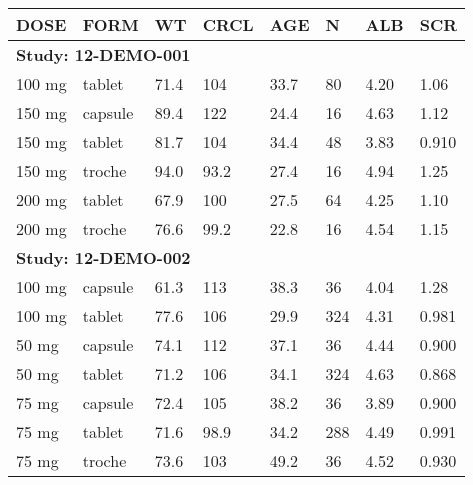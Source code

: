 {\def\arraystretch{1.4}\tabcolsep=5pt
\begin{threeparttable}
\begin{tabular}[h]{llllllll}
\hline
DOSE & FORM & WT & CRCL & AGE & N & ALB & SCR \\
\hline
\multicolumn{8}{l}{\textbf{Study:  12-DEMO-001}}\\
100 mg & tablet & 71.4 & 104 & 33.7 & 80 & 4.20 & 1.06 \\
150 mg & capsule & 89.4 & 122 & 24.4 & 16 & 4.63 & 1.12 \\
150 mg & tablet & 81.7 & 104 & 34.4 & 48 & 3.83 & 0.910 \\
150 mg & troche & 94.0 & 93.2 & 27.4 & 16 & 4.94 & 1.25 \\
200 mg & tablet & 67.9 & 100 & 27.5 & 64 & 4.25 & 1.10 \\
200 mg & troche & 76.6 & 99.2 & 22.8 & 16 & 4.54 & 1.15 \\
\hline \multicolumn{8}{l}{\textbf{Study:  12-DEMO-002}}\\
100 mg & capsule & 61.3 & 113 & 38.3 & 36 & 4.04 & 1.28 \\
100 mg & tablet & 77.6 & 106 & 29.9 & 324 & 4.31 & 0.981 \\
50 mg & capsule & 74.1 & 112 & 37.1 & 36 & 4.44 & 0.900 \\
50 mg & tablet & 71.2 & 106 & 34.1 & 324 & 4.63 & 0.868 \\
75 mg & capsule & 72.4 & 105 & 38.2 & 36 & 3.89 & 0.900 \\
75 mg & tablet & 71.6 & 98.9 & 34.2 & 288 & 4.49 & 0.991 \\
75 mg & troche & 73.6 & 103 & 49.2 & 36 & 4.52 & 0.930 \\
\hline
\end{tabular}
\end{threeparttable}
}
